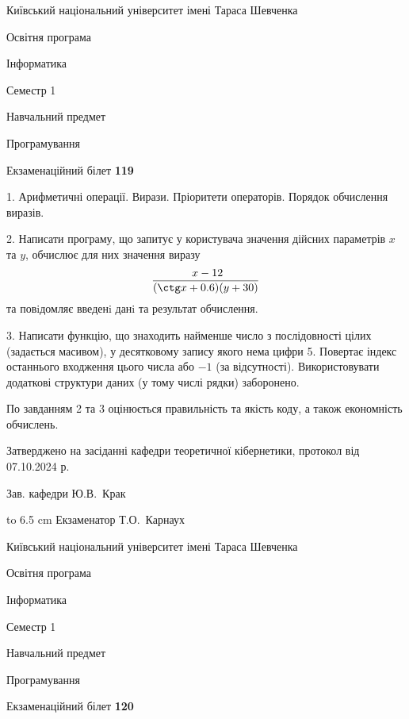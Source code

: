 \documentclass[12pt, ukrainian]{article}
\begin{document}
{{\begin {scriptsize}\par
{ \center  Київський національний університет імені Тараса Шевченка \par}
{\parbox {5 cm}{Освітня програма \hfill}{\parbox {7 cm}{Інформатика\hfill}}\parbox {6 cm}{\hfill Семестр 1}}\par
{\parbox {5 cm} {Навчальний предмет \hfill}\parbox {7 cm}{Програмування \hfill}\parbox {6cm}{\hfill}\par}\vspace{-15pt} \end{scriptsize}}{\center Екзаменаційний білет \No \textbf { 119 }\par}}
{%
1. Арифметичні операції. Вирази. Пріоритети операторів. Порядок обчислення виразів.%
\par
2. Написати програму, що запитує у користувача значення дійсних параметрів $x$ та $y$, обчислює для них значення виразу 
$$\frac{\ x - 12}{(\ctg x + 0.6) (y + 30)}$$ 
та повiдомляє введенi данi та результат обчислення.

\par
3. Написати функцію, що знаходить найменше число з послідовності цілих (задається масивом), у десятковому запису якого нема цифри 5. Повертає індекс останнього входження цього числа або $-1$ (за відсутності). Використовувати додаткові структури даних (у тому числі рядки) заборонено.

По завданням 2 та 3 оцінюється правильність та якість коду, а також економність обчислень.

}
{\smallskip\smallskip \begin {scriptsize} Затверджено на засіданні кафедри теоретичної кібернетики, протокол   від   07.10.2024 р.\par\smallskip\smallskip\smallskip\smallskip
{\parbox {6.5 cm} {Зав. кафедри \dotfill Ю.В.~Крак}}\hspace {0.7cm} {\hbox to 6.5 cm { Екзаменатор \dotfill Т.О.~Карнаух}} \end{scriptsize}}
\vspace{0.9cm}
{{\begin {scriptsize}\par
{ \center  Київський національний університет імені Тараса Шевченка \par}
{\parbox {5 cm}{Освітня програма \hfill}{\parbox {7 cm}{Інформатика\hfill}}\parbox {6 cm}{\hfill Семестр 1}}\par
{\parbox {5 cm} {Навчальний предмет \hfill}\parbox {7 cm}{Програмування \hfill}\parbox {6cm}{\hfill}\par}\vspace{-15pt} \end{scriptsize}}{\center Екзаменаційний білет \No \textbf { 120 }\par}}
\end{document}
